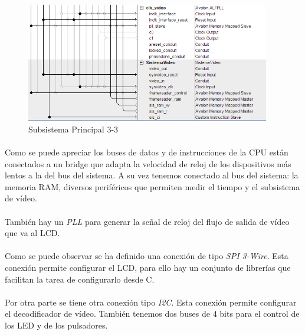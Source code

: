 \documentclass[a4paper,12pt,titlepage,final]{book}
\begin{document}
\begin{figure}[p]
\centering
\includegraphics[height=0.5\textheight,
width=0.95\textwidth]{./figuras/SistemaPrincipal/sistemaprincipalpagina3.png}
\caption{Subsistema Principal 3-3}
\label{fig:Subsistema Principal 3-3}
\end{figure}

\paragraph{}
Como se puede apreciar los buses de datos y de instrucciones de la CPU están conectados a un bridge que adapta la velocidad de reloj de los dispositivos más lentos a la del bus del sistema. A su vez tenemos conectado al bus del sistema: la memoria RAM, diversos periféricos que permiten medir el tiempo y el subsistema de vídeo.

\paragraph{}
También hay un \textit{PLL} para generar la señal de reloj del flujo de salida de vídeo que va al LCD.

\paragraph{}
Como se puede observar se ha definido una conexión de tipo \textit{SPI 3-Wire}. Esta conexión permite configurar el LCD, para ello hay un conjunto de librerías que facilitan la tarea de configurarlo desde C. 

\paragraph{}
Por otra parte se tiene otra conexión tipo \textit{I2C}. Esta conexión permite configurar el  decodificador de vídeo. También tenemos dos buses de 4 bits para el control de los LED y de los pulsadores.
\end{document}
